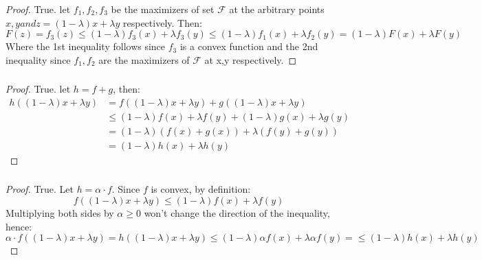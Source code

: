 \subsubsection{}
\begin{proof}    
    True. let $f_1, f_2, f_3$ be the maximizers of set $\mathcal{F}$ at the arbitrary points $x, y and z=(1-\lambda)x + \lambda y$ respectively. Then:
    \begin{equation*}
        F(z) = f_3(z) \leq (1-\lambda)f_3(x) + \lambda f_3(y) \leq (1-\lambda)f_1(x) + \lambda f_2(y) = (1-\lambda)F(x) + \lambda F(y)
    \end{equation*}
    Where the 1st inequality follows since $f_3$ is a convex function and the 2nd inequality since $f_1, f_2$ are the maximizers of $\mathcal{F}$ at x,y respectively.
\end{proof}

\subsubsection{}
\begin{proof}    
    True. let $h = f + g$, then:
    \begin{equation*}
        \begin{split}
            h((1-\lambda)x + \lambda y) &= f((1-\lambda)x + \lambda y) + g((1-\lambda)x + \lambda y) \\
            &\leq (1-\lambda)f(x) + \lambda f(y) + (1-\lambda)g(x) + \lambda g(y) \\
            &= (1-\lambda)(f(x) + g(x)) + \lambda (f(y) + g(y)) \\
            &= (1-\lambda)h(x) + \lambda h(y)             
        \end{split}
    \end{equation*}
\end{proof}

\subsubsection{}
\begin{proof}    
    True. Let $h = \alpha \cdot f$. Since $f$ is convex, by definition:
    \begin{equation*}
        f((1-\lambda)x + \lambda y) \leq (1-\lambda)f(x) + \lambda f(y)
    \end{equation*}
    Multiplying both sides by $\alpha \geq 0$ won't change the direction of the inequality, hence:
    \begin{equation*}
        \alpha \cdot f((1-\lambda)x + \lambda y) = h((1-\lambda)x + \lambda y) \leq (1-\lambda) \alpha f(x) + \lambda \alpha f(y) = \leq (1-\lambda) h(x) + \lambda h(y)
    \end{equation*}    
\end{proof}

